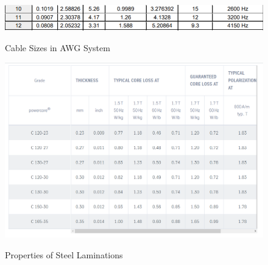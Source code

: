 \begin{figure}[H]
\hspace{1.5cm}
\centering\includegraphics[width=4.5in]{awg.PNG}\\
\caption{Cable Sizes in AWG System}
\label{awg}
\end{figure}

\begin{figure}[H]
\hspace{1.5cm}
\centering\includegraphics[width=4.5in]{steel_prop.PNG}\\
\caption{Properties of Steel Laminations}
\label{steel}
\end{figure} 


